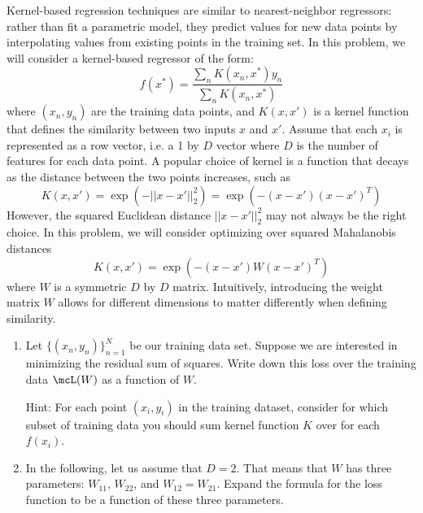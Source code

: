 \documentclass[submit]{harvardml}
\begin{document}
\begin{problem}

Kernel-based regression techniques are similar to nearest-neighbor
regressors: rather than fit a parametric model, they predict values
for new data points by interpolating values from existing points in
the training set.  In this problem, we will consider a kernel-based
regressor of the form:
\begin{equation*}
  f(x^*) = \frac{ \sum_{n} K(x_n,x^*) y_n  }{ \sum_{n} K(x_n,x^*) } 
\end{equation*}
where $(x_n,y_n)$ are the training data points, and $K(x,x')$ is a
kernel function that defines the similarity between two inputs $x$ and
$x'$. Assume that each $x_i$ is represented as a row vector, i.e. a
1 by $D$ vector where $D$ is the number of features for each data point. A popular choice of 
kernel is a function that decays as the distance between the two points increases, such as
\begin{equation*}
  K(x,x') = \exp(-||x-x'||^2_2) = \exp(-(x-x') (x-x')^T ) 
\end{equation*} 
However, the squared Euclidean distance $||x-x'||^2_2$ may not always
be the right choice.  In this problem, we will consider optimizing
over squared Mahalanobis distances
\begin{equation*}
  K(x,x') = \exp(-(x-x') W (x-x')^T ) 
  \label{eqn:distance}
\end{equation*} 
where $W$ is a symmetric $D$ by $D$ matrix.  Intuitively, introducing
the weight matrix $W$ allows for different dimensions to matter
differently when defining similarity.
\begin{enumerate}

\item Let $\{(x_n,y_n)\}_{n=1}^N$ be our training data set.  Suppose
  we are interested in minimizing the residual sum of squares.  Write down this
  loss over the training data $\mcL(W)$ as a function of $W$.
  
  Hint:  For each point $(x_i, y_i)$ in the training dataset, consider for which subset of training data you should sum kernel function $K$ over for each $f(x_i)$.

\item In the following, let us assume that $D = 2$.  That means that
  $W$ has three parameters: $W_{11}$, $W_{22}$, and $W_{12} = W_{21}$.
  Expand the formula for the loss function to be a function of these
  three parameters.
  

\end{enumerate}
\end{problem}
\end{document}
